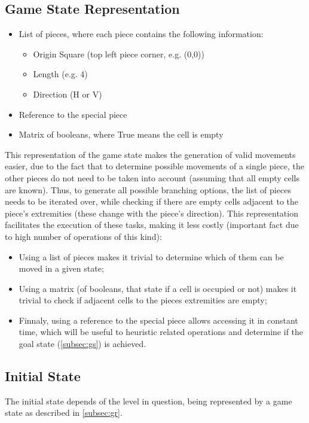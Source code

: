 \documentclass[conference]{IEEEtran}
\begin{document}
\subsection{Game State Representation} \label{subsec:gr}

\begin{itemize}
    \item List of pieces, where each piece contains the following information:
    \begin{itemize}
        \item Origin Square (top left piece corner, e.g. (0,0))
        \item Length (e.g. 4)
        \item Direction (H or V)
    \end{itemize}
    \item Reference to the special piece
    \item Matrix of booleans, where True means the cell is empty
\end{itemize}

This representation of the game state makes the generation of valid movements easier, due to the fact that to determine possible movements of a single piece, the other pieces do not need to be taken into account (assuming that all empty cells are known). Thus, to generate all possible branching options, the list of pieces needs to be iterated over, while checking if there are empty cells adjacent to the piece's extremities (these change with the piece's direction). This representation facilitates the execution of these tasks, making it less costly (important fact due to high number of operations of this kind):

\begin{itemize}
    \item Using a list of pieces makes it trivial to determine which of them can be moved in a given state;
    \item Using a matrix (of booleans, that state if a cell is occupied or not) makes it trivial to check if adjacent cells to the pieces extremities are empty;
    \item Finnaly, using a reference to the special piece allows accessing it in constant time, which will be useful to heuristic related operations and determine if the goal state (\autoref{subsec:gs}) is achieved.
\end{itemize}

\subsection{Initial State}
The initial state depends of the level in question, being represented by a game state as described in \autoref{subsec:gr}.
\end{document}
